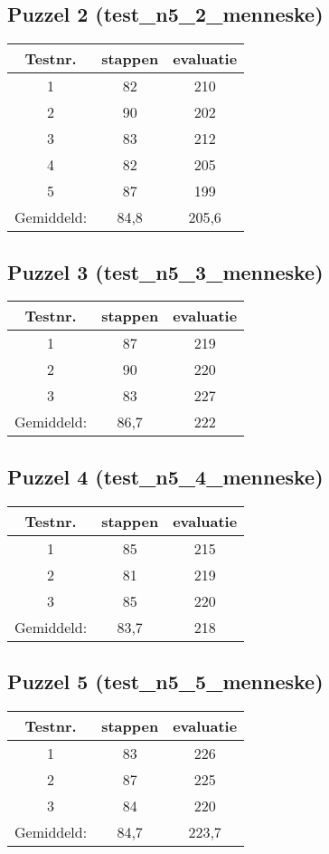 \documentclass[]{report}
\begin{document}
\begin{appendices}
\subsection{Puzzel 2 (test\_n5\_2\_menneske)}
\begin{tabular}{|c||c|c|}
\hline Testnr. & stappen & evaluatie \\ 
\hline \hline 1 & 82 & 210 \\ 
\hline 2 & 90 & 202 \\ 
\hline 3 & 83 & 212 \\ 
\hline 4 & 82 & 205 \\ 
\hline 5 & 87 & 199 \\ 
\hline \hline Gemiddeld: & 84,8 & 205,6 \\ 
\hline 
\end{tabular} 
\subsection{Puzzel 3 (test\_n5\_3\_menneske)}
\begin{tabular}{|c||c|c|}
\hline Testnr. & stappen & evaluatie \\ 
\hline \hline 1 & 87 & 219 \\ 
\hline 2 & 90 & 220 \\ 
\hline 3 & 83 & 227 \\ 
\hline \hline Gemiddeld: & 86,7 & 222 \\ 
\hline 
\end{tabular} 
\subsection{Puzzel 4 (test\_n5\_4\_menneske)}
\begin{tabular}{|c||c|c|}
\hline Testnr. & stappen & evaluatie \\ 
\hline \hline 1 & 85 & 215 \\ 
\hline 2 & 81 & 219 \\ 
\hline 3 & 85 & 220 \\ 
\hline \hline Gemiddeld: & 83,7 & 218 \\ 
\hline 
\end{tabular} 
\subsection{Puzzel 5 (test\_n5\_5\_menneske)}
\begin{tabular}{|c||c|c|}
\hline Testnr. & stappen & evaluatie \\ 
\hline \hline 1 & 83 & 226 \\ 
\hline 2 & 87 & 225 \\ 
\hline 3 & 84 & 220 \\ 
\hline \hline Gemiddeld: & 84,7 & 223,7 \\ 
\hline 
\end{tabular} 


\end{appendices}
\end{document}
